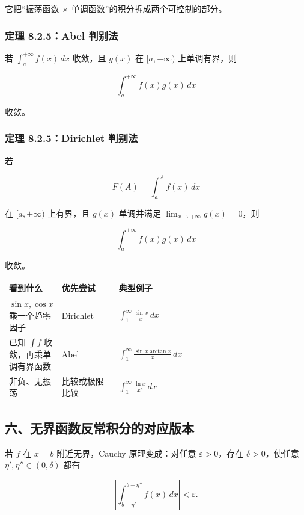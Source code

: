 它把“振荡函数 \(\times\) 单调函数”的积分拆成两个可控制的部分。

\subsubsection*{定理 8.2.5：Abel 判别法}

若 \(\int_a^{+\infty}f(x)\,dx\) 收敛，且 \(g(x)\) 在 \([a,+\infty)\) 上单调有界，则

\[
      \int_a^{+\infty}f(x)g(x)\,dx
    \]

收敛。

\subsubsection*{定理 8.2.5：Dirichlet 判别法}

若

\[
      F(A)=\int_a^A f(x)\,dx
    \]

在 \([a,+\infty)\) 上有界，且 \(g(x)\) 单调并满足 \(\lim_{x\to+\infty}g(x)=0\)，则

\[
      \int_a^{+\infty}f(x)g(x)\,dx
    \]

收敛。

\begin{center}
\small
\begin{tabularx}{\linewidth}{|>{\raggedright\arraybackslash}p{0.18\linewidth}|>{\raggedright\arraybackslash}p{0.42\linewidth}|>{\raggedright\arraybackslash}X|}
\hline
\textbf{看到什么} & \textbf{优先尝试} & \textbf{典型例子} \\ \hline
\(\sin x,\cos x\) 乘一个趋零因子 & Dirichlet & \(\int_1^\infty \frac{\sin x}{x}\,dx\) \\ \hline
已知 \(\int f\) 收敛，再乘单调有界函数 & Abel & \(\int_1^\infty \frac{\sin x\arctan x}{x}\,dx\) \\ \hline
非负、无振荡 & 比较或极限比较 & \(\int_1^\infty \frac{\ln x}{x^p}\,dx\) \\ \hline
\end{tabularx}
\end{center}

\subsection*{六、无界函数反常积分的对应版本}

若 \(f\) 在 \(x=b\) 附近无界，Cauchy 原理变成：对任意 \(\varepsilon>0\)，存在 \(\delta>0\)，使任意 \(\eta',\eta''\in(0,\delta)\) 都有

\[
      \left|\int_{b-\eta'}^{b-\eta''}f(x)\,dx\right|<\varepsilon.
    \]

